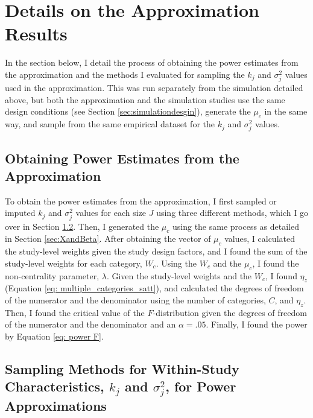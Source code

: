 \section{Details on the Approximation Results}

In the section below, I detail the process of obtaining the power estimates from the approximation and the methods I evaluated for sampling the $k_j$ and $\sigma_j^2$ values used in the approximation. This was run separately from the simulation detailed above, but both the approximation and the simulation studies use the same design conditions (see Section \ref{sec:simulationdesgin}), generate the $\mu_c$ in the same way, and sample from the same empirical dataset \autocite{WilliamsRyan2022HiMI} for the $k_j$ and $\sigma_j^2$ values. 

\subsection{Obtaining Power Estimates from the Approximation}

To obtain the power estimates from the approximation, I first sampled or imputed $k_j$ and $\sigma_j^2$ values for each size $J$ using three different methods, which I go over in Section \ref{sec: sampling}. Then, I generated the $\mu_c$ using the same process as detailed in Section \ref{sec:XandBeta}. After obtaining the vector of $\mu_c$ values, I calculated the study-level weights given the study design factors, and I found the sum of the study-level weights for each category, $W_c$. Using the $W_c$ and the $\mu_c$, I found the non-centrality parameter, $\lambda$. Given the study-level weights and the $W_c$, I found $\eta_z$ (Equation \ref{eq: multiple_categories_satt}), and calculated the degrees of freedom of the numerator and the denominator using the number of categories, $C$, and $\eta_z$. Then, I found the critical value of the $F$-distribution  given the degrees of freedom of the numerator and the denominator and an $\alpha=.05$. Finally, I found the power by Equation \ref{eq: power F}.

\subsection{Sampling Methods for Within-Study Characteristics, \texorpdfstring{$k_j$}{ } and \texorpdfstring{$\sigma^2_j$}{ }, for Power Approximations} \label{sec: sampling}

